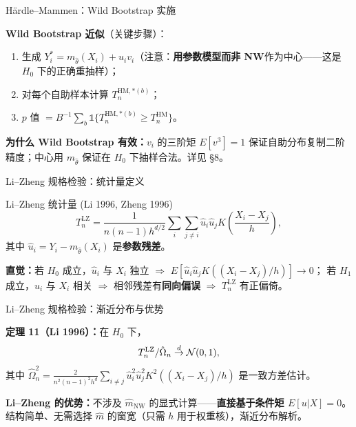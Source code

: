 \documentclass[aspectratio=169, 10pt]{beamer}
\begin{document}
\begin{frame}{Härdle--Mammen：Wild Bootstrap 实施}

  \textbf{Wild Bootstrap 近似}（关键步骤）：
  \begin{enumerate}
    \item 生成 $Y_i^* = m_{\hat\theta}(X_i) + \hat u_i v_i$（注意：\textbf{用参数模型而非 NW}作为中心——这是 $H_0$ 下的正确重抽样）；
    \item 对每个自助样本计算 $T_n^{\text{HM},*(b)}$；
    \item $p$ 值 $= B^{-1}\sum_b \mathds{1}\{T_n^{\text{HM},*(b)} \geq T_n^{\text{HM}}\}$。
  \end{enumerate}

  \begin{keybox}
    \textbf{为什么 Wild Bootstrap 有效：}$v_i$ 的三阶矩 $E[v^3]=1$ 保证自助分布复制二阶精度；中心用 $m_{\hat\theta}$ 保证在 $H_0$ 下抽样合法。详见 \S8。
  \end{keybox}

\end{frame}


\begin{frame}{Li--Zheng 规格检验：统计量定义}

  \begin{definitionbox}{{Li--Zheng 统计量 (Li 1996, Zheng 1996)}}
    \[
      T_n^{\text{LZ}} = \frac{1}{n(n-1)h^{d/2}} \sum_{i}\sum_{j\neq i} \hat u_i \hat u_j K\!\left(\frac{X_i - X_j}{h}\right),
    \]
    其中 $\hat u_i = Y_i - m_{\hat\theta}(X_i)$ 是\textbf{参数残差}。
  \end{definitionbox}

  \textbf{直觉：}若 $H_0$ 成立，$\hat u_i$ 与 $X_i$ 独立 $\Rightarrow$ $E[\hat u_i \hat u_j K((X_i-X_j)/h)] \to 0$；
  若 $H_1$ 成立，$\hat u_i$ 与 $X_i$ 相关 $\Rightarrow$ 相邻残差有\textbf{同向偏误} $\Rightarrow$ $T_n^{\text{LZ}}$ 有正偏倚。

\end{frame}


\begin{frame}{Li--Zheng 规格检验：渐近分布与优势}

  \begin{highlightbox}
    \textbf{定理 11（Li 1996）：}在 $H_0$ 下，
    \[
      T_n^{\text{LZ}}/\hat\Omega_n \overset{d}{\to} \mathcal{N}(0, 1),
    \]
    其中 $\hat\Omega_n^2 = \frac{2}{n^2(n-1)^2 h^d}\sum_{i\neq j}\hat u_i^2 \hat u_j^2 K^2((X_i - X_j)/h)$ 是一致方差估计。
  \end{highlightbox}

  \begin{keybox}
    \textbf{Li--Zheng 的优势：}不涉及 $\hat m_{\text{NW}}$ 的显式计算——\textbf{直接基于条件矩 $E[u|X]=0$}。结构简单、无需选择 $\hat m$ 的窗宽（只需 $h$ 用于权重核），渐近分布解析。
  \end{keybox}

\end{frame}
\end{document}
